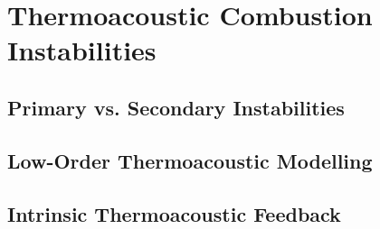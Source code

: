 \cite{monaghan1992SmoothedParticleHydrodynamics, vacondio2021GrandChallengesSmoothed}






\section{Thermoacoustic Combustion Instabilities}


\subsection{Primary vs. Secondary Instabilities}



\subsection{Low-Order Thermoacoustic Modelling}



\subsection{Intrinsic Thermoacoustic Feedback}


